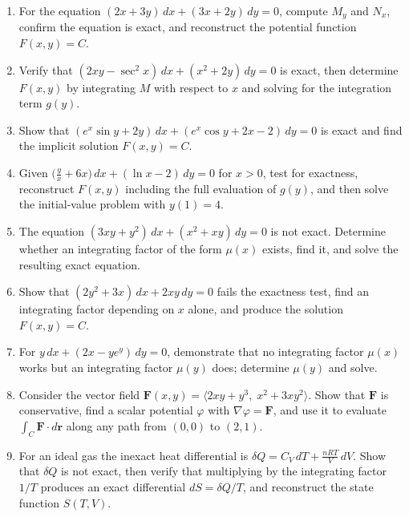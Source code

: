 \begin{enumerate}[leftmargin=2em, itemsep=8pt]

    \item For the equation $(2x + 3y)\,dx + (3x + 2y)\,dy = 0$, compute $M_y$
          and $N_x$, confirm the equation is exact, and reconstruct the
          potential function $F(x,y) = C$.

    \item Verify that $(2xy - \sec^2\!x)\,dx + (x^2 + 2y)\,dy = 0$ is exact,
          then determine $F(x,y)$ by integrating $M$ with respect to $x$ and
          solving for the integration term $g(y)$.

    \item Show that $(e^x\sin y + 2y)\,dx + (e^x\cos y + 2x - 2)\,dy = 0$
          is exact and find the implicit solution $F(x,y) = C$.

    \item Given $\bigl(\tfrac{y}{x} + 6x\bigr)\,dx + (\ln x - 2)\,dy = 0$
          for $x > 0$, test for exactness, reconstruct $F(x,y)$ including the
          full evaluation of $g(y)$, and then solve the initial-value problem
          with $y(1) = 4$.

    \item The equation $(3xy + y^2)\,dx + (x^2 + xy)\,dy = 0$ is not exact.
          Determine whether an integrating factor of the form $\mu(x)$ exists,
          find it, and solve the resulting exact equation.

    \item Show that $(2y^2 + 3x)\,dx + 2xy\,dy = 0$ fails the exactness test,
          find an integrating factor depending on $x$ alone, and produce the
          solution $F(x,y) = C$.

    \item For $y\,dx + (2x - ye^y)\,dy = 0$, demonstrate that no integrating
          factor $\mu(x)$ works but an integrating factor $\mu(y)$ does;
          determine $\mu(y)$ and solve.

    \item Consider the vector field
          $\mathbf{F}(x,y) = \langle 2xy + y^3,\; x^2 + 3xy^2 \rangle$.
          Show that $\mathbf{F}$ is conservative, find a scalar potential
          $\varphi$ with $\nabla\varphi = \mathbf{F}$, and use it to evaluate
          $\displaystyle\int_C \mathbf{F}\cdot d\mathbf{r}$ along any path
          from $(0,0)$ to $(2,1)$.

    \item For an ideal gas the inexact heat differential is
          $\delta Q = C_V\,dT + \tfrac{nRT}{V}\,dV$.
          Show that $\delta Q$ is not exact, then verify that multiplying by
          the integrating factor $1/T$ produces an exact differential
          $dS = \delta Q/T$, and reconstruct the state function $S(T,V)$.


\end{enumerate}
